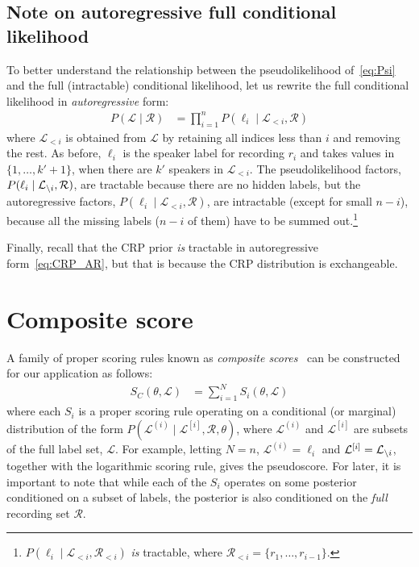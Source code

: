\documentclass[a4paper,oneside,12pt,english]{report}
\def\Lset{\mathcal{L}}
\def\Rset{\mathcal{R}}
\begin{document}
\subsection{Note on autoregressive full conditional likelihood}
To better understand the relationship between the pseudolikelihood of~\eqref{eq:Psi} and the full (intractable) conditional likelihood, let us rewrite the full conditional likelihood in \emph{autoregressive} form:
\begin{align}
P(\Lset \mid \Rset) &= \prod_{i=1}^{n} P(\ell_i\mid\Lset_{< i},\Rset)
\end{align} 
where $\Lset_{< i}$ is obtained from $\Lset$ by retaining all indices less than $i$ and removing the rest. As before, $\ell_i$ is the speaker label for recording $r_i$ and takes values in $\{1,\ldots,k'+1\}$, when there are $k'$ speakers in $\Lset_{< i}$. The pseudolikelihood factors, $P(\ell_i\mid\Li,\Rset)$, are tractable because there are no hidden labels, but the autoregressive factors, $P(\ell_i\mid\Lset_{< i},\Rset)$, are intractable (except for small $n-i$), because all the missing labels ($n-i$ of them) have to be summed out.\footnote{$P(\ell_i\mid\Lset_{<i},\Rset_{<i})$ \emph{is} tractable, where $\Rset_{<i}=\{r_1,\ldots,r_{i-1}\}$.}

Finally, recall that the CRP prior \emph{is} tractable in autoregressive form~\eqref{eq:CRP_AR}, but that is because the CRP distribution is exchangeable.


\section{Composite score}
A family of proper scoring rules known as \emph{composite scores}~\cite{Dawid_Musio_ThApp_PSR_2014} can be constructed for our application as follows:
\begin{align}
S_C(\theta,\Lset) &= \sum_{i=1}^N S_i(\theta,\Lset)
\end{align}
where each $S_i$ is a proper scoring rule operating on a conditional (or marginal) distribution of the form $P(\Lset^{(i)}\mid\Lset^{[i]},\Rset,\theta)$, where $\Lset^{(i)}$ and $\Lset^{[i]}$ are subsets of the full label set, $\Lset$. For example, letting $N=n$, $\Lset^{(i)}=\ell_i$ and $\Lset^{[i]}=\Li$, together with the logarithmic scoring rule, gives the pseudoscore. For later, it is important to note that while each of the $S_i$ operates on some posterior conditioned on a subset of labels, the posterior is also  conditioned on the \emph{full} recording set $\Rset$.   
\end{document}
